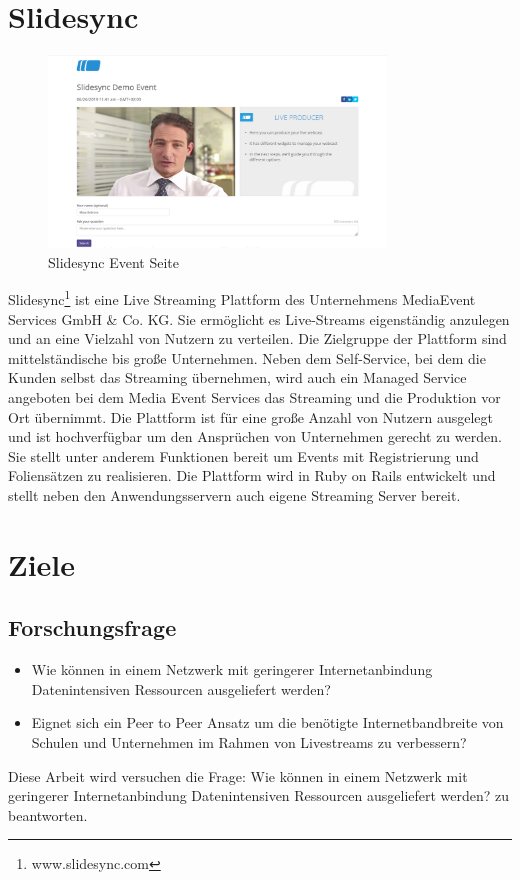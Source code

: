 \section{Slidesync}
\begin{figure}[!h]
	\centering
	\includegraphics[width=0.8\textwidth]{figures/slidesync_screenshot}
	\caption[A Figure Short-Title]{Slidesync Event Seite}
	\label{fig:slidesync_screenshot}
\end{figure}
Slidesync\footnote{www.slidesync.com} ist eine Live Streaming Plattform des Unternehmens MediaEvent Services GmbH & Co. KG. Sie ermöglicht es Live-Streams eigenständig anzulegen und an eine Vielzahl von Nutzern zu verteilen. Die Zielgruppe der Plattform sind mittelständische bis große Unternehmen. Neben dem Self-Service, bei dem die Kunden selbst das Streaming übernehmen, wird auch ein Managed Service angeboten bei dem Media Event Services das Streaming und die Produktion vor Ort übernimmt. Die Plattform ist für eine große Anzahl von Nutzern ausgelegt und ist hochverfügbar um den Ansprüchen von Unternehmen gerecht zu werden. Sie stellt unter anderem Funktionen bereit um Events mit Registrierung und Foliensätzen zu realisieren. Die Plattform wird in Ruby on Rails entwickelt und stellt neben den Anwendungsservern auch eigene Streaming Server bereit.

\section{Ziele}
\subsection{Forschungsfrage}
\begin{itemize}
	\item Wie können in einem Netzwerk mit geringerer Internetanbindung Datenintensiven Ressourcen ausgeliefert werden?
	\item Eignet sich ein Peer to Peer Ansatz um die benötigte Internetbandbreite von Schulen und Unternehmen im Rahmen von Livestreams zu verbessern?
\end{itemize}
Diese Arbeit wird versuchen die Frage: 
Wie können in einem Netzwerk mit geringerer Internetanbindung Datenintensiven Ressourcen ausgeliefert werden? 
zu beantworten.

